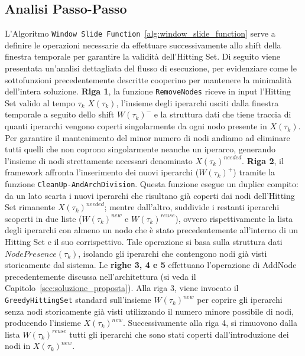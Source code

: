 \subsection{Analisi Passo-Passo}

L'Algoritmo \texttt{Window Slide Function}~\ref{alg:window_slide_function} serve a definire le operazioni necessarie da effettuare successivamente allo shift della finestra temporale per garantire la validità dell'Hitting Set.
Di seguito viene presentata un'analisi dettagliata del flusso di esecuzione, per evidenziare come le sottofunzioni precedentemente descritte cooperino per mantenere la minimalità dell'intera soluzione.\newline
\newline
\textbf{Riga 1}, la funzione \texttt{RemoveNodes} riceve in input l'Hitting Set valido al tempo $\tau_k$ $X(\tau_k)$, l'insieme degli iperarchi usciti dalla finestra temporale a seguito dello shift $W(\tau_k)^-$ e la struttura dati che tiene traccia di quanti iperarchi vengono coperti singolarmente da ogni nodo presente in $X(\tau_k)$.
Per garantire il mantenimento del minor numero di nodi andiamo ad eliminare tutti quelli che non coprono singolarmente neanche un iperarco, generando l'insieme di nodi strettamente necessari denominato $X(\tau_k)^{needed}$.\newline
\textbf{Riga 2}, il framework affronta l'inserimento dei nuovi iperarchi ($W(\tau_k)^+$) tramite la funzione \texttt{CleanUp-}\newline\texttt{AndArchDivision}.
Questa funzione esegue un duplice compito: da un lato scarta i nuovi iperarchi che risultano già coperti dai nodi dell'Hitting Set rimanente $X(\tau_k)^{needed}$; mentre dall'altro, suddivide i restanti iperarchi scoperti in due liste ($W(\tau_k)^{new}$ e $W(\tau_k)^{reuse}$), ovvero rispettivamente la lista degli iperarchi con almeno un nodo che è stato precedentemente all'interno di un Hitting Set e il suo corrispettivo.
Tale operazione si basa sulla struttura dati $NodePresence(\tau_k)$, isolando gli iperarchi che contengono nodi già visti storicamente dal sistema.\newline
Le \textbf{righe 3, 4 e 5} effettuano l'operazione di AddNode precedentemente discussa nell'architettura (si veda il Capitolo~\ref{sec:soluzione_proposta}).
Alla riga 3, viene invocato il \texttt{GreedyHittingSet} standard sull'insieme $W(\tau_k)^{new}$ per coprire gli iperarchi senza nodi storicamente già visti utilizzando il numero minore possibile di nodi, producendo l'insieme $X(\tau_k)^{new}$.
Successivamente alla riga 4, si rimuovono dalla lista $W(\tau_k)^{reuse}$ tutti gli iperarchi che sono stati coperti dall'introduzione dei nodi in $X(\tau_k)^{new}$.
